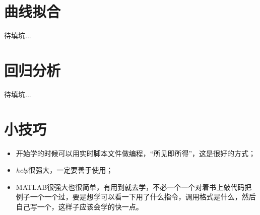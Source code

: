 \documentclass{hfutpaper}
\begin{document}
\section{曲线拟合}
待填坑...
\section{回归分析}
待填坑...
\section{小技巧}
\begin{itemize}
	\item 开始学的时候可以用实时脚本文件做编程，“所见即所得”，这是很好的方式；
	\item \emph{help}很强大，一定要善于使用；
	\item MATLAB很强大也很简单，有用到就去学，不必一个一个对着书上敲代码把例子一个一个过，要是想学可以看一下用了什么指令，调用格式是什么，然后自己写一个，这样子应该会学的快一点。
\end{itemize}
\end{document}

